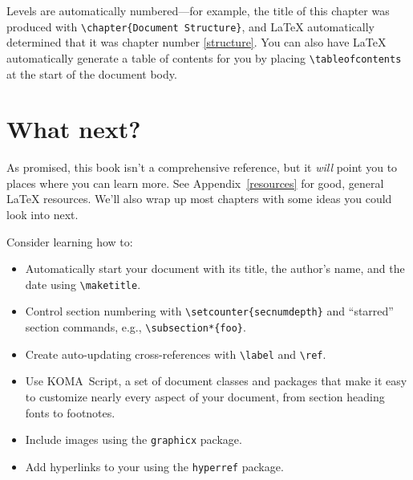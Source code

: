 Levels are automatically numbered---for example,
the title of this chapter was produced with \verb|\chapter{Document Structure}|,
and \LaTeX{} automatically determined that it was chapter number \ref{structure}.
You can also have \LaTeX{} automatically generate a table of contents for you
by placing \verb|\tableofcontents| at the start of the document body.

\section{What next?}

As promised, this book isn't a comprehensive reference,
but it \emph{will} point you to places where you can learn more.
See Appendix~\ref{resources} for good, general \LaTeX{} resources.
We'll also wrap up most chapters with some ideas you could look into next.

Consider learning how to:
\begin{itemize}
\item Automatically start your document with its title, the author's name,
    and the date using \verb|\maketitle|.
\item Control section numbering with \verb|\setcounter{secnumdepth}|
and ``starred'' section commands, e.g., \verb|\subsection*{foo}|.
\item Create auto-updating cross-references with \verb|\label| and \verb|\ref|.
\item Use KOMA~Script, a set of document classes and packages
that make it easy to customize nearly every aspect of your document,
from section heading fonts to footnotes.
\item Include images using the \texttt{graphicx} package.
\item Add hyperlinks to your  using the \texttt{hyperref} package.
\end{itemize}
